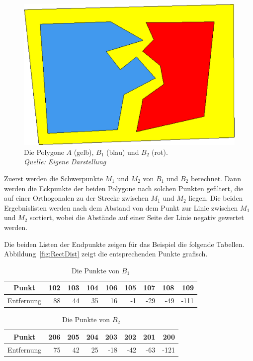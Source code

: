\begin{figure}
	\centering
	\includegraphics[scale=0.45]{ZuZersplitten.eps}
	\caption[Zu teilendes Polygon mit Referenzpolygonen]{Die Polygone $A$ (gelb), $B_1$ (blau) und $B_2$ (rot).\\\textit{Quelle: Eigene Darstellung}}
	\label{fig:ZuZersplitten}
\end{figure}

Zuerst werden die Schwerpunkte $M_1$ und $M_2$  von $B_1$ und $B_2$ berechnet. Dann werden die Eckpunkte der beiden Polygone nach solchen Punkten gefiltert, die auf einer Orthogonalen zu der Strecke zwischen $M_1$ und $M_2$ liegen. Die beiden Ergebnislisten werden nach dem Abstand von dem Punkt zur Linie zwischen $M_1$ und $M_2$ sortiert, wobei die Abstände auf einer Seite der Linie negativ gewertet werden.

Die beiden Listen der Endpunkte zeigen für das Beispiel die folgende Tabellen. Abbildung~\vref{fig:RectDist} zeigt die entsprechenden Punkte grafisch.

\begin{table}[!h]
\begin{tabular}{|c|r|r|r|r|r|r|r|r|}
\hline
Punkt&
 102&
 103&
 104&
 106&
 105&
 107&
 108&
 109\\
\hline
Entfernung&
   88&
   44&
   35&
   16&
   -1&
  -29&
  -49&
 -111\\
\hline
\end{tabular} 
\caption{Die Punkte von $B_1$}
\end{table}
\begin{table}[!h]


\begin{tabular}{|c|r|r|r|r|r|r|r|}



\hline
Punkt&
 206&
 205&
 204&
 203&
 202&
 201&
 200
\\
\hline
Entfernung&
   75&
   42&
   25&
  -18&
  -42&
  -63&
 -121
\\
\hline
\end{tabular} 
\caption{Die Punkte von $B_2$}
\end{table}


